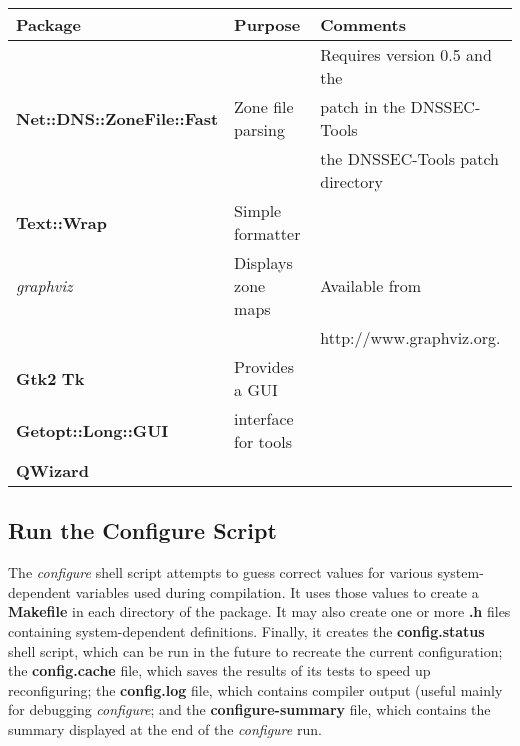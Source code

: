 \documentclass[12pt]{article}
\newcommand{\cmd}[1]{{\em #1}}
\newcommand{\perlmod}[1]{{\bf #1}}
\newcommand{\path}[1]{{\bf #1}}
\begin{document}
\begin{table}[hb]
\begin{tabular}{lll}
Package	& Purpose & Comments\\
\hline

	& & Requires version 0.5 and the \\
\perlmod{Net::DNS::ZoneFile::Fast}		&
Zone file parsing		& patch in the DNSSEC-Tools \\
	& & the DNSSEC-Tools patch directory	\\


\hline

\perlmod{Text::Wrap}				&
Simple formatter				&
						\\

\hline

\cmd{graphviz}					&
Displays zone maps				&
Available from					\\
	& & http://www.graphviz.org.		\\

\hline

\perlmod{Gtk2} {\bf}  \perlmod{Tk}	& Provides a GUI 	 & \\
\perlmod{Getopt::Long::GUI}		& interface for tools	 & \\
\perlmod{QWizard}			&		 & \\

\hline
\end{tabular}
\end{table}

\eject


\subsection{Run the Configure Script}

The \cmd{configure} shell script attempts to guess correct values for various
system-dependent variables used during compilation.  It uses those values to
create a \path{Makefile} in each directory of the package. It may also create
one or more \path{.h} files containing system-dependent definitions.  Finally,
it creates the \path{config.status} shell script, which can be run in the future
to recreate the current configuration; the \path{config.cache} file, which
saves the results of its tests to speed up reconfiguring; the \path{config.log}
file, which contains compiler output (useful mainly for debugging
\cmd{configure}; and the \path{configure-summary} file, which contains the
summary displayed at the end of the \cmd{configure} run.
\end{document}
